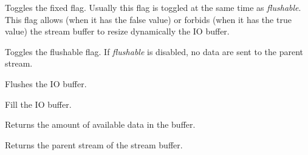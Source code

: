 \label{wxstreambufferfixed}


Toggles the fixed flag. Usually this flag is toggled at the same time as 
{\it flushable}. This flag allows (when it has the false value) or forbids
(when it has the true value) the stream buffer to resize dynamically the IO buffer.



\label{wxstreambufferflushable}


Toggles the flushable flag. If {\it flushable} is disabled, no data are sent
to the parent stream.

\label{wxstreambufferflushbuffer}


Flushes the IO buffer.

\label{wxstreambufferfillbuffer}


Fill the IO buffer.

\label{wxstreambuffergetdataleft}


Returns the amount of available data in the buffer.

\label{wxstreambufferstream}


Returns the parent stream of the stream buffer.

